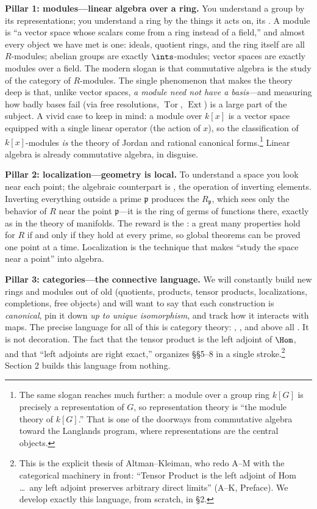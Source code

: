 \documentclass[11pt]{article}
\DeclareMathOperator{\Tor}{Tor}
\DeclareMathOperator{\Ext}{Ext}
\newcommand{\mfp}{\mathfrak{p}}
\begin{document}
\textbf{Pillar 1: modules---linear algebra over a ring.} You understand a group by its
representations; you understand a ring by the things it acts on, its . A
module is ``a vector space whose scalars come from a ring instead of a field,'' and almost
every object we have met is one: ideals, quotient rings, and the ring itself are all
$R$-modules; abelian groups are exactly $\ints$-modules; vector spaces are exactly modules
over a field. The modern slogan is that commutative algebra is the study of the category of
$R$-modules. The single phenomenon that makes the theory deep is that, unlike vector spaces,
\emph{a module need not have a basis}---and measuring how badly bases fail (via free
resolutions, $\Tor$, $\Ext$) is a large part of the subject. A vivid case to keep in mind: a
module over $k[x]$ is a vector space equipped with a single linear operator (the action of
$x$), so the classification of $k[x]$-modules \emph{is} the theory of Jordan and rational
canonical forms.\footnote{The same slogan reaches much further: a module over a group ring
$k[G]$ is precisely a representation of $G$, so representation theory is ``the module theory
of $k[G]$.'' That is one of the doorways from commutative algebra toward the Langlands
program, where representations are the central objects.} Linear algebra is already
commutative algebra, in disguise.

\textbf{Pillar 2: localization---geometry is local.} To understand a space you look near each
point; the algebraic counterpart is , the operation of inverting
elements. Inverting everything outside a prime $\mfp$ produces the 
$R_\mfp$, which sees only the behavior of $R$ near the point $\mfp$---it is the ring of
germs of functions there, exactly as in the theory of manifolds. The reward is the
: a great many properties hold for $R$ if and only if they
hold at every prime, so global theorems can be proved one point at a time. Localization is
the technique that makes ``study the space near a point'' into algebra.

\textbf{Pillar 3: categories---the connective language.} We will constantly build new rings
and modules out of old (quotients, products, tensor products, localizations, completions,
free objects) and will want to say that each construction is \emph{canonical}, pin it down
\emph{up to unique isomorphism}, and track how it interacts with maps. The precise language
for all of this is category theory: , , and
above all . It is not decoration. The fact that the tensor product
is the left adjoint of $\Hom$, and that ``left adjoints are right exact,'' organizes
\S\S5--8 in a single stroke.\footnote{This is the explicit thesis of Altman--Kleiman, who
redo A--M with the categorical machinery in front: ``Tensor Product is the left adjoint of
Hom \dots\ any left adjoint preserves arbitrary direct limits'' (A--K, Preface). We develop
exactly this language, from scratch, in \S2.} Section 2 builds this language from nothing.
\end{document}
